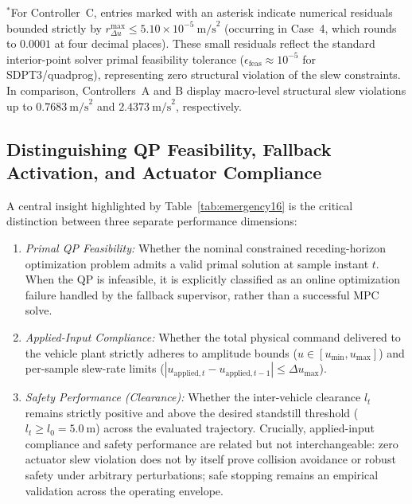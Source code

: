 \documentclass[journal]{IEEEtran}
\begin{document}
\begin{table}[t]
\begin{flushleft}
$^*$For Controller~C, entries marked with an asterisk indicate numerical residuals bounded strictly by $r_{\Delta u}^{\max} \le 5.10 \times 10^{-5}~\text{m/s}^2$ (occurring in Case~4, which rounds to $0.0001$ at four decimal places). These small residuals reflect the standard interior-point solver primal feasibility tolerance ($\epsilon_{\mathrm{feas}} \approx 10^{-5}$ for SDPT3/quadprog), representing zero structural violation of the slew constraints. In comparison, Controllers~A and B display macro-level structural slew violations up to $0.7683~\text{m/s}^2$ and $2.4373~\text{m/s}^2$, respectively.
\end{flushleft}
\end{table}

\subsection{Distinguishing QP Feasibility, Fallback Activation, and Actuator Compliance}

A central insight highlighted by Table~\ref{tab:emergency16} is the critical distinction between three separate performance dimensions:
\begin{enumerate}
    \item \emph{Primal QP Feasibility:} Whether the nominal constrained receding-horizon optimization problem admits a valid primal solution at sample instant $t$. When the QP is infeasible, it is explicitly classified as an online optimization failure handled by the fallback supervisor, rather than a successful MPC solve.
    \item \emph{Applied-Input Compliance:} Whether the total physical command delivered to the vehicle plant strictly adheres to amplitude bounds ($u \in [u_{\min}, u_{\max}]$) and per-sample slew-rate limits ($|u_{\mathrm{applied},t} - u_{\mathrm{applied},t-1}| \le \Delta u_{\max}$).
    \item \emph{Safety Performance (Clearance):} Whether the inter-vehicle clearance $l_t$ remains strictly positive and above the desired standstill threshold ($l_t \ge l_0 = 5.0~\text{m}$) across the evaluated trajectory. Crucially, applied-input compliance and safety performance are related but not interchangeable: zero actuator slew violation does not by itself prove collision avoidance or robust safety under arbitrary perturbations; safe stopping remains an empirical validation across the operating envelope.
\end{enumerate}
\end{document}

